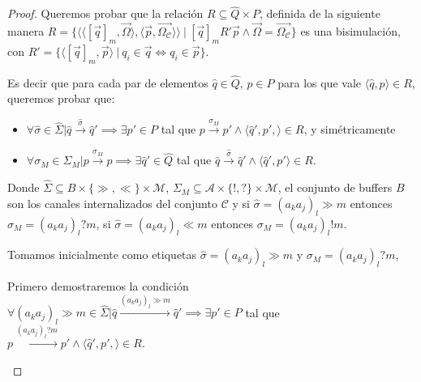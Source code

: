 \begin{proof}
Queremos probar que la relación $R \subseteq \widehat{Q} \times P$, definida de la siguiente manera $R = \{ \langle \langle [\overrightarrow{q}]_m, \overrightarrow{\Omega} \rangle, \langle \overrightarrow{p}, \overrightarrow{\Omega_{\mathcal{C}}} \rangle \rangle \ | \ [\overrightarrow{q}]_mR'\overrightarrow{p} \land  \overrightarrow{\Omega}=\overrightarrow{\Omega_{\mathcal{C}}} \}$ es una bisimulación, con $R'=\{\langle [\overrightarrow{q}]_m, \overrightarrow{p} \rangle \ | \ q_i \in \overrightarrow{q} \iff q_i \in \overrightarrow{p} \}$.

Es decir que para cada par de elementos $\widehat{q} \in \widehat{Q}$, $p \in P$ para los que vale $\langle \widehat{q}, p \rangle \in R$, queremos probar que:
\begin{itemize}
\item $\forall \widehat{\sigma} \in \widehat{\Sigma} | \widehat{q} \xrightarrow{\widehat{\sigma}} \widehat{q}' \implies \exists p' \in P$ tal que $p \xrightarrow{\sigma_M} p' \land \langle \widehat{q}', p', \rangle \in R$, y simétricamente 
\item $\forall \sigma_M \in \Sigma_M | p \xrightarrow{\sigma_M} p \implies \exists \widehat{q}' \in \widehat{Q}$ tal que $\widehat{q} \xrightarrow{\widehat{\sigma}} \widehat{q}' \land \langle \widehat{q}', p'\rangle \in R$. 
\end{itemize}
Donde $\widehat{\Sigma} \subseteq B \times \{\gg,\ll\} \times \mathcal{M}$, $\Sigma_M \subseteq \mathcal{A} \times \{!,?\} \times \mathcal{M}$, el conjunto de buffers $B$ son los canales internalizados del conjunto $\mathcal{C}$ y si $\widehat{\sigma}= (a_ka_j)_l \gg m$ entonces $\sigma_M = (a_ka_j)_l?m$,  si $\widehat{\sigma}= (a_ka_j)_l \ll m$ entonces $\sigma_M = (a_ka_j)_l!m$. 

Tomamos inicialmente como etiquetas $\widehat{\sigma} = (a_ka_j)_l \gg m$ y $\sigma_M = (a_ka_j)_l?m$, 

Primero demostraremos la condición $\forall (a_ka_j)_l \gg m \in \widehat{\Sigma} | \widehat{q} \xrightarrow{(a_ka_j)_l \gg m} \widehat{q}' \implies \exists p' \in P$ tal que $p \xrightarrow{(a_ka_j)_l?m} p' \land \langle \widehat{q}', p', \rangle \in R$. 
 
\begin{itemize}
    

\end{itemize}
\end{proof}
